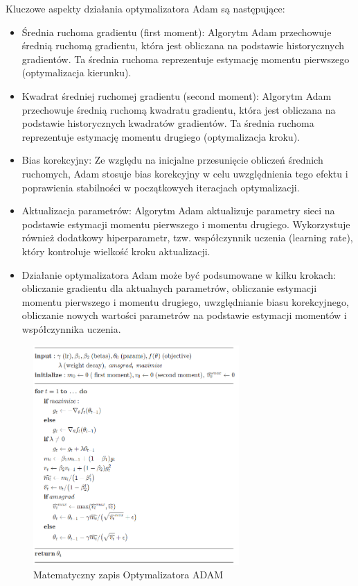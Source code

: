 \documentclass[12pt,twoside]{article}
\begin{document}
Kluczowe aspekty działania optymalizatora Adam są następujące:
\begin{itemize}
	
\item Średnia ruchoma gradientu (first moment): Algorytm Adam przechowuje średnią ruchomą gradientu, która jest obliczana na podstawie historycznych gradientów. Ta średnia ruchoma reprezentuje estymację momentu pierwszego (optymalizacja kierunku).

\item Kwadrat średniej ruchomej gradientu (second moment): Algorytm Adam przechowuje średnią ruchomą kwadratu gradientu, która jest obliczana na podstawie historycznych kwadratów gradientów. Ta średnia ruchoma reprezentuje estymację momentu drugiego (optymalizacja kroku).

\item Bias korekcyjny: Ze względu na inicjalne przesunięcie obliczeń średnich ruchomych, Adam stosuje bias korekcyjny w celu uwzględnienia tego efektu i poprawienia stabilności w początkowych iteracjach optymalizacji.

\item Aktualizacja parametrów: Algorytm Adam aktualizuje parametry sieci na podstawie estymacji momentu pierwszego i momentu drugiego. Wykorzystuje również dodatkowy hiperparametr, tzw. współczynnik uczenia (learning rate), który kontroluje wielkość kroku aktualizacji.

\item Działanie optymalizatora Adam może być podsumowane w kilku krokach: obliczanie gradientu dla aktualnych parametrów, obliczanie estymacji momentu pierwszego i momentu drugiego, uwzględnianie biasu korekcyjnego, obliczanie nowych wartości parametrów na podstawie estymacji momentów i współczynnika uczenia.

\end{itemize}

\begin{figure}[h]
	\centering
	\includegraphics[width=0.7\textwidth]{figures/ADAM.png}
	\caption{Matematyczny zapis Optymalizatora ADAM}
	\label{fig:312}
\end{figure}
\end{document}

